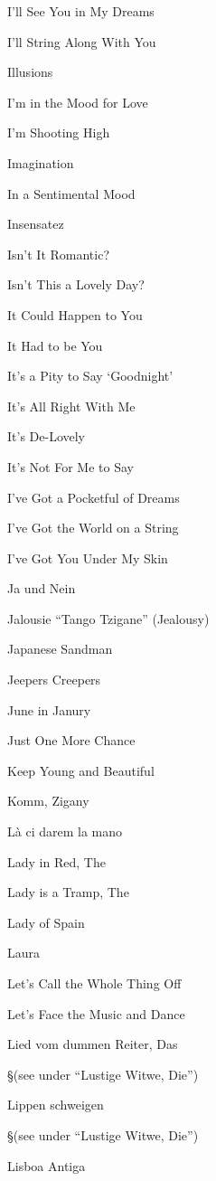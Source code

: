 \N I'll See You in My Dreams


\N I'll String Along With You


\N Illusions


\N I'm in the Mood for Love


\N I'm Shooting High


\N Imagination


\N In a Sentimental Mood


\N Insensatez


\N Isn't It Romantic?


\N Isn't This a Lovely Day?


\N It Could Happen to You


\N It Had to be You


\N It's a Pity to Say `Goodnight'


\N It's All Right With Me


\N It's De-Lovely


\N It's Not For Me to Say


\N I've Got a Pocketful of Dreams


\N I've Got the World on a String


\N I've Got You Under My Skin


\N Ja und Nein


\N Jalousie ``Tango Tzigane'' (Jealousy)


\N Japanese Sandman


\N Jeepers Creepers


\N June in Janury


\N Just One More Chance


\N Keep Young and Beautiful


\N Komm, Zigany


\N L{\`a} ci darem la mano


\N Lady in Red, The


\N Lady is a Tramp, The


\N Lady of Spain


\N Laura


\N Let's Call the Whole Thing Off


\N Let's Face the Music and Dance


\N Lied vom dummen Reiter, Das

\nobreak
\S (see under ``Lustige Witwe, Die'')

\N Lippen schweigen

\nobreak
\S (see under ``Lustige Witwe, Die'')

\N Lisboa Antiga


